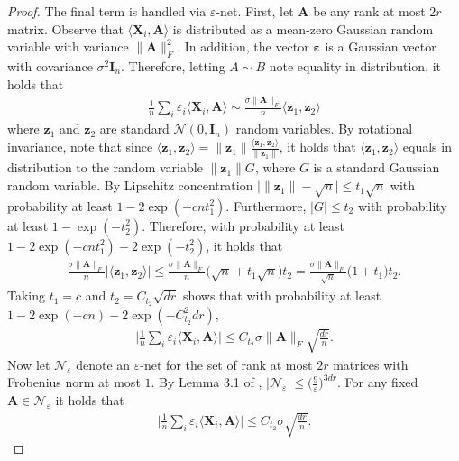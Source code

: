 \documentclass[10pt]{article}
\newcommand{\eps}{\ensuremath{\varepsilon}}
\theoremstyle{definition}
\begin{document}
\begin{proof}
 The final term is handled via $\eps$-net. First, let $\bm{A}$ be any rank at most $2r$ matrix.  Observe that $\langle \bm{X}_i, \bm{A} \rangle$ is distributed as a mean-zero Gaussian random variable with variance $\|\bm{A}\|_F^2$.  In addition, the vector $\bm{\eps}$ is a Gaussian vector with covariance $\sigma^2 \bm{I}_n$.  Therefore, letting $A \sim B$ note equality in distribution, it holds that
 \begin{align}
    \frac{1}{n} \sum_{i} \eps_i \langle \bm{X}_i, \bm{A} \rangle \sim   \frac{\sigma \|\bm{A}\|_F}{n}\langle \bm{z}_1, \bm{z}_2 \rangle 
 \end{align}
 where $\bm{z}_1$ and $\bm{z}_2$ are standard $\mathcal{N}(0,\bm{I}_n)$ random variables.  By rotational invariance, note that since $\langle \bm{z}_1, \bm{z}_2 \rangle = \| \bm{z}_1 \|\frac{\langle \bm{z}_1, \bm{z}_2 \rangle}{\| \bm{z}_1 \|}$, it holds that $\langle \bm{z}_1, \bm{z}_2 \rangle$ equals in distribution to the random variable $ \| \bm{z}_1 \| G$, where $G$ is a standard Gaussian random variable. By Lipschitz concentration $\big| \|\bm{z}_1 \| - \sqrt{n} \big| \leq t_1 \sqrt{n} $ with probability at least $1 -2 \exp( - c  n t_1^2)$.  Furthermore, $|G| \leq t_2$ with probability at least $1 - \exp(- t_2^2)$.  Therefore, with probability at least $1 - 2 \exp( - c n t_1^2) - 2 \exp( - t_2^2)$, it holds that
 \begin{align}
      \frac{\sigma \| \bm{A} \|_F}{n} \big|\langle \bm{z}_1 , \bm{z}_2 \rangle \big| \leq   \frac{\sigma \| \bm{A} \|_F }{n} \big( \sqrt{n} + t_1 \sqrt{n} \big) t_2 = \frac{\sigma \| \bm{A} \|_F}{\sqrt{n}} \big( 1 + t_1\big) t_2.
 \end{align}
 Taking $t_1= c$ and $t_2 = C_{t_2} \sqrt{d r}$ shows that with probability at least $1 - 2 \exp( - c n) - 2 \exp( - C_{t_2}^2 dr )$,
 \begin{align}
     \bigg|  \frac{1}{n} \sum_{i} \eps_i \langle \bm{X}_i, \bm{A} \rangle  \bigg| \leq C_{t_2} \sigma \| \bm{A} \|_F  \sqrt{\frac{dr}{n}}.
 \end{align}
 Now let $\mathcal{N}_{\eps}$ denote an $\eps$-net for the set of rank at most $2r$ matrices with Frobenius norm at most $1$. By Lemma 3.1 of \citet{candes_tight_2011}, $| \mathcal{N}_{\eps} | \leq \bigg( \frac{9}{\eps} \bigg)^{3 d r}$.   For any fixed $\bm{A} \in \mathcal{N}_{\eps}$ it holds that
 \begin{align}
     \bigg| \frac{1}{n} \sum_{i} \eps_i \langle \bm{X}_i, \bm{A} \rangle \bigg| \leq C_{t_2} \sigma \sqrt{\frac{dr}{n}}.  
 \end{align}

\end{proof}
\end{document}
